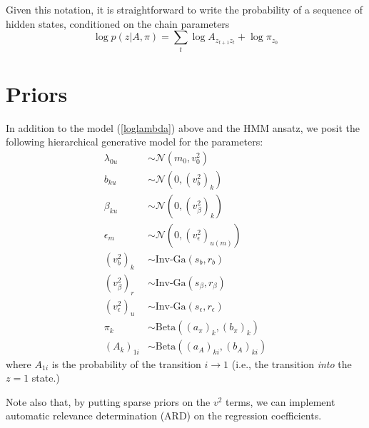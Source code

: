 \documentclass[11pt]{article}
\begin{document}
Given this notation, it is straightforward to write the probability of a sequence of hidden states, conditioned on the chain parameters
\begin{equation}
    \log p(z|A, \pi) = \sum_t \log A_{z_{t+1} z_t} + \log \pi_{z_0}
\end{equation}

\section{Priors}
In addition to the model (\ref{loglambda}) above and the HMM ansatz, we posit the following hierarchical generative model for the parameters:
\begin{align}
    \lambda_{0u} &\sim \mathcal{N}(m_0, v^2_0) \\
    b_{ku} &\sim \mathcal{N}\left(0, (v^2_b)_{k}\right) \\
    \beta_{ku} &\sim \mathcal{N}\left(0, (v^2_\beta)_{k}\right) \\
    \epsilon_m &\sim \mathcal{N}\left(0, (v^2_\epsilon)_{u(m)}\right) \\
    (v^2_b)_{k} &\sim \text{Inv-Ga}\left(s_b, r_b \right) \\
    (v^2_\beta)_{r} &\sim \text{Inv-Ga}\left(s_\beta, r_\beta \right) \\
    (v^2_\epsilon)_{u} &\sim \text{Inv-Ga}\left(s_\epsilon, r_\epsilon \right) \\
    \pi_k &\sim \mathrm{Beta}\left((a_\pi)_k, (b_\pi)_k \right) \\ 
    \left(A_k \right)_{1i} &\sim \mathrm{Beta}\left((a_A)_{ki}, (b_A)_{ki} \right)  
    \end{align}
where $A_{1i}$ is the probability of the transition $i \rightarrow 1$ (i.e., the transition \emph{into} the $z = 1$ state.)

Note also that, by putting sparse priors on the $v^2$ terms, we can implement automatic relevance determination (ARD) on the regression coefficients.
\end{document}
